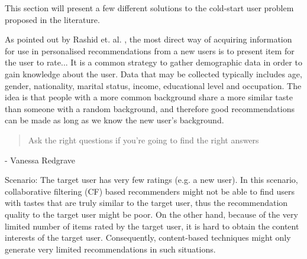 This section will present a few different solutions to the cold-start user problem proposed in the literature.

		As pointed out by Rashid et. al. \cite{Rashid2002}, the most direct way of acquiring information for use in personalised recommendations from a new users is to present item for the user to rate...
 			It is a common strategy to gather demographic data in order to gain knowledge about the user. Data that may be collected typically includes age, gender, nationality, marital status, income, educational level and occupation. The idea is that people with a more common background share a more similar taste than someone with a random background, and therefore good recommendations can be made as long as we know the new user’s background.


\begin{quotation}
Ask the right questions if you're going to find the right answers
\end{quotation}
- Vanessa Redgrave


Scenario: The target user has very few ratings (e.g. a new user). In this scenario, collaborative filtering (CF) based recommenders might not be able to find users with tastes that are truly similar to the target user, thus the recommendation quality to the target user might be poor. On the other hand, because of the very limited number of items rated by the target user, it is hard to obtain the content interests of the target user. Consequently, content-based techniques might only generate very limited recommendations in such situations.

